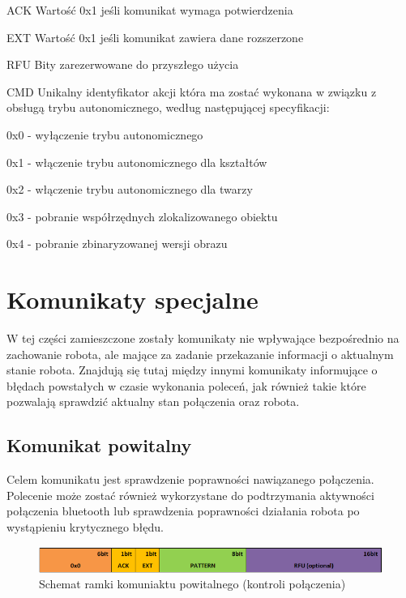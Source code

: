 \begin{basedescript}{\desclabelstyle{\pushlabel}\desclabelwidth{25mm}}
\setlength{\parsep}{0pt}
\setlength{\itemsep}{0mm}
\setlength{\parskip}{0pt}
\item[ACK]
	Wartość 0x1 jeśli komunikat wymaga potwierdzenia
\item[EXT] 
	Wartość 0x1 jeśli komunikat zawiera dane rozszerzone
\item[RFU] 
	Bity zarezerwowane do przyszłego użycia
\item[CMD] 
	Unikalny identyfikator akcji która ma zostać wykonana w związku z obsługą
	trybu autonomicznego, według następującej specyfikacji:
	\begin{desc}
	\item[0x0] - wyłączenie trybu autonomicznego
	\item[0x1] - włączenie trybu autonomicznego dla kształtów
	\item[0x2] - włączenie trybu autonomicznego dla twarzy
	\item[0x3] - pobranie współrzędnych zlokalizowanego obiektu
	\item[0x4] - pobranie zbinaryzowanej wersji obrazu 
	\end{desc}
\end{basedescript}

\section{Komunikaty specjalne}
W tej części zamieszczone zostały komunikaty nie wpływające bezpośrednio na
zachowanie robota, ale mające za zadanie przekazanie informacji o aktualnym
stanie robota. Znajdują się tutaj między innymi komunikaty informujące o
błędach powstałych w czasie wykonania poleceń, jak również takie które pozwalają
sprawdzić aktualny stan połączenia oraz robota.

\subsection{Komunikat powitalny}
Celem komunikatu jest sprawdzenie poprawności nawiązanego połączenia. Polecenie
może zostać również wykorzystane do podtrzymania aktywności połączenia bluetooth
lub sprawdzenia poprawności działania robota po wystąpieniu krytycznego błędu.

\begin{figure}[h!]
 \centering
 \includegraphics[width=\textwidth]{../images/appendix/cmd_0x00.png}
 \caption{Schemat ramki komuniaktu powitalnego (kontroli połączenia)} 
 \label{fig:CMD_0x00}
\end{figure}

